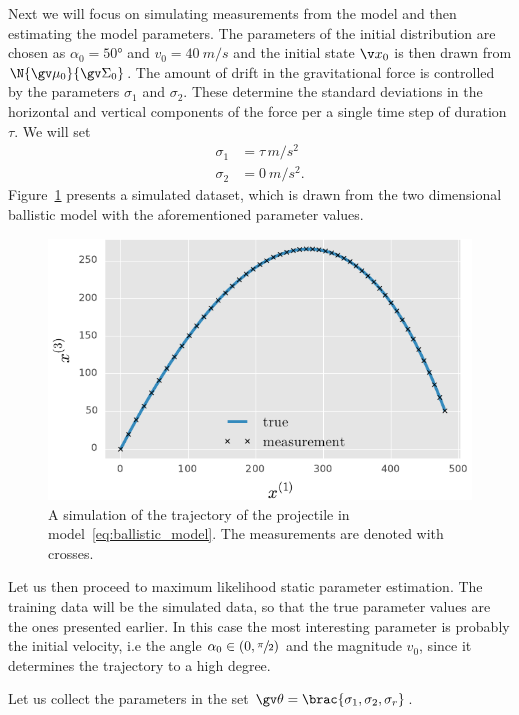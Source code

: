 Next we will focus on simulating measurements from the model and then estimating
the model parameters. The parameters of the initial distribution are chosen as
$\alpha_0 = \ang{50}$ and $v_0 = \SI{40}{m/s}$ and the initial state $\x_0$ is then
drawn from $\N{\gv\mu_0}{\gv\Sigma_0}$. The amount of drift in the gravitational force 
is controlled by the parameters $\sigma_1$ and $\sigma_2$.
These determine the standard deviations in the horizontal and vertical
components of the force per a single time step of duration $\tau$.
We will set 
\begin{align}
	\sigma_1&=\tau\,\si{m/s^2}\\
	\sigma_2&=\SI{0}{m/s^2}.
\end{align} 
%
Figure~\ref{fig:ballistic2D_simulation} presents  a simulated dataset, 
which is drawn from the two dimensional ballistic model with the aforementioned parameter
values.

\begin{figure}[htb]%
    \centering%
    \includegraphics{img/ballistic_trajectory}%
	\caption{%
	A simulation of the trajectory
	of the projectile in model~\eqref{eq:ballistic_model}.
   	The measurements are denoted with crosses. %
   	}
	\label{fig:ballistic2D_simulation}
 \end{figure}

Let us then proceed to maximum likelihood static parameter estimation. The training
data will be the simulated data, so that the true parameter values are the ones presented
earlier. In this case the most interesting parameter is probably the initial velocity,
i.e the angle $\alpha_0\in(0,\sfrac{\pi}{2})$ and the magnitude $v_0$, since it determines
the trajectory to a high degree.

 
Let us collect the parameters in the set $\Th=\brac{\sigma_1,\sigma_2,\sigma_r}$.

